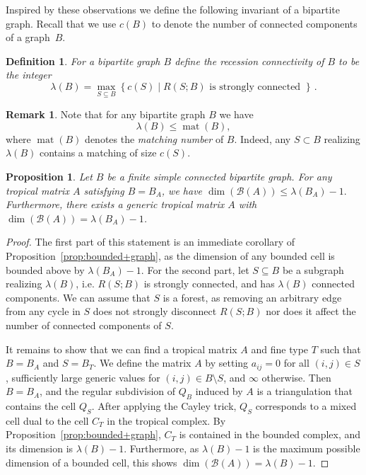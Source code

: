 \documentclass[11pt]{article}
\newtheorem{definition}[theo]{Definition}
\newtheorem{prop}[theo]{Proposition}
\theoremstyle{definition}
\newtheorem{remark}[theo]{Remark}
\numberwithin{equation}{section}
\newcommand{\cB}{\mathcal{B}}
\newcommand{\bddgraph}[2]{R(#1;#2)}
\newcommand{\mat}{\operatorname{mat}}
\begin{document}
Inspired by these observations we define the following invariant of a bipartite graph.  Recall that we use $c(B)$ to denote the number of connected components of a graph~$B$.

\begin{definition}\label{def: recession}
For a bipartite graph $B$ define the \emph{recession connectivity} of $B$ to be the integer
\[
\lambda(B) = \max_{S \subseteq B}\left\{c(S) \mid \bddgraph{S}{B} \text{ is strongly connected } \right\} \, .
\]
\end{definition} 


\begin{remark}\label{rem: lambdamatching}
Note that for any bipartite graph $B$ we have 
\[\lambda(B) \leq \mat(B),\]
\noindent
where $\mat(B)$ denotes the \emph{matching number} of $B$. Indeed, any $S \subset B$ realizing $\lambda(B)$ contains a matching of size $c(S)$.
\end{remark}


\begin{prop} \label{prop: bounded+complex+dimension}
Let $B$ be a finite simple connected bipartite graph.
For any tropical matrix $A$ satisfying $B = B_A$, we have $\dim(\cB(A)) \leq \lambda(B_A) - 1.$
Furthermore, there exists a generic tropical matrix $A$ with $\dim(\cB(A)) = \lambda(B_A) - 1$.
\end{prop}

\begin{proof}
The first part of this statement is an immediate corollary of Proposition~\ref{prop:bounded+graph}, as the dimension of any bounded cell is bounded above by $\lambda(B_A) - 1$.
For the second part, let $S \subseteq B$ be a subgraph realizing $\lambda(B)$, i.e. $\bddgraph{S}{B}$ is strongly connected, and has $\lambda(B)$ connected components.
We can assume that $S$ is a forest, as removing an arbitrary edge from any cycle in $S$ does not strongly disconnect $\bddgraph{S}{B}$ nor does it affect the number of connected components of $S$.

It remains to show that we can find a tropical matrix $A$ and fine type $T$ such that $B = B_A$ and $S = B_T$.
We define the matrix $A$ by setting $a_{ij} = 0$ for all $(i,j) \in S$, sufficiently large generic values for $(i,j) \in B \setminus S$, and $\infty$ otherwise.
Then $B = B_A$, and the regular subdivision of $Q_B$ induced by $A$ is a triangulation that contains the cell $Q_{S}$.
After applying the Cayley trick, $Q_{S}$ corresponds to a mixed cell dual to the cell $C_T$ in the tropical complex.
By Proposition~\ref{prop:bounded+graph}, $C_T$ is contained in the bounded complex, and its dimension is $\lambda(B) - 1$.
Furthermore, as $\lambda(B) - 1$ is the maximum possible dimension of a bounded cell, this shows $\dim(\cB(A)) = \lambda(B) -1$.
\end{proof}
\end{document}
